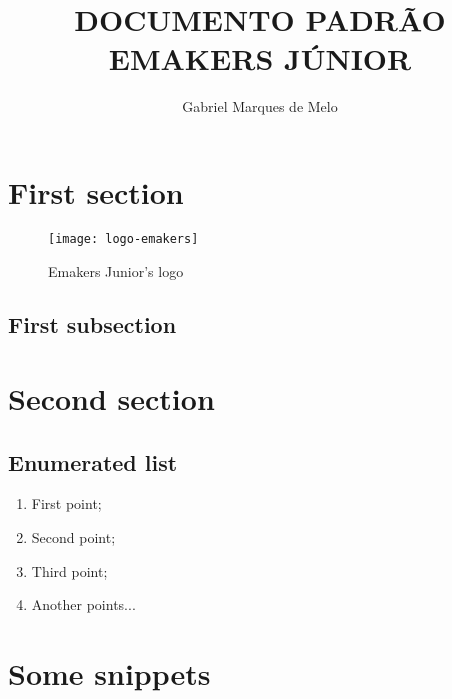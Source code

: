 






\def\titulo{DOCUMENTO PADRÃO EMAKERS JÚNIOR}

\title{\titulo}
\author{Gabriel Marques de Melo}
    

    \initdoc

    \section{First section}\label{sec:firstSection}
        \lipsum[1]

        \begin{figure}[!htb]
            \centering
            \texttt{[image: logo-emakers]}
            \caption{Emakers Junior's logo}
            \label{logo-emakers}
        \end{figure}

        \subsection{First subsection}\label{subsec:firstSubsection}
        \lipsum[1]

    \section{Second section}\label{sec:secondSection}
        \lipsum[1]
        \subsection{Enumerated list}

        \begin{enumerate}[label=(\roman*)]
            \item First point;
            \item Second point;
            \item Third point;
            \item Another points...
        \end{enumerate}


    \section{Some snippets}\label{sec:snippets}
    	\label{snippet:example_code_1}

